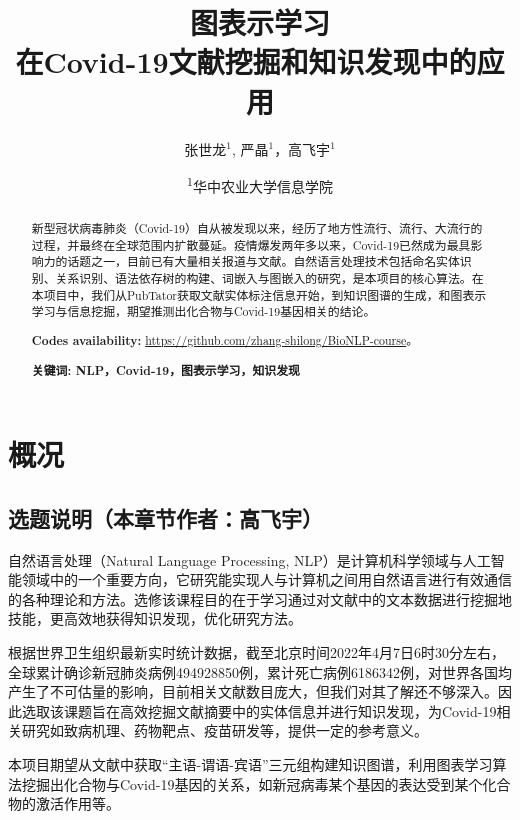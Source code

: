 \documentclass[twocolumn]{article}
\title{图表示学习\\在Covid-19文献挖掘和知识发现中的应用}
\author{张世龙$^{1}$, 严晶$^{1}$，高飞宇$^{1}$}
\date{
\textsuperscript{1}华中农业大学信息学院}
\begin{document}
\maketitle

\begin{abstract}
新型冠状病毒肺炎（Covid-19）自从被发现以来，经历了地方性流行、流行、大流行的过程，并最终在全球范围内扩散蔓延。疫情爆发两年多以来，Covid-19已然成为最具影响力的话题之一，目前已有大量相关报道与文献。自然语言处理技术包括命名实体识别、关系识别、语法依存树的构建、词嵌入与图嵌入的研究，是本项目的核心算法。在本项目中，我们从PubTator获取文献实体标注信息开始，到知识图谱的生成，和图表示学习与信息挖掘，期望推测出化合物与Covid-19基因相关的结论。\par
{\bf Codes availability:} \url{https://github.com/zhang-shilong/BioNLP-course}。\par
{\bf 关键词: NLP，Covid-19，图表示学习，知识发现}
\end{abstract}

\maketitle

\section{概况}
\subsection{选题说明（本章节作者：高飞宇）}
自然语言处理（Natural Language Processing, NLP）是计算机科学领域与人工智能领域中的一个重要方向，它研究能实现人与计算机之间用自然语言进行有效通信的各种理论和方法。选修该课程目的在于学习通过对文献中的文本数据进行挖掘地技能，更高效地获得知识发现，优化研究方法。\par
根据世界卫生组织最新实时统计数据，截至北京时间2022年4月7日6时30分左右，全球累计确诊新冠肺炎病例494928850例，累计死亡病例6186342例，对世界各国均产生了不可估量的影响，目前相关文献数目庞大，但我们对其了解还不够深入。因此选取该课题旨在高效挖掘文献摘要中的实体信息并进行知识发现，为Covid-19相关研究如致病机理、药物靶点、疫苗研发等，提供一定的参考意义。\par
本项目期望从文献中获取“主语-谓语-宾语”三元组构建知识图谱，利用图表学习算法挖掘出化合物与Covid-19基因的关系，如新冠病毒某个基因的表达受到某个化合物的激活作用等。\par
\end{document}
